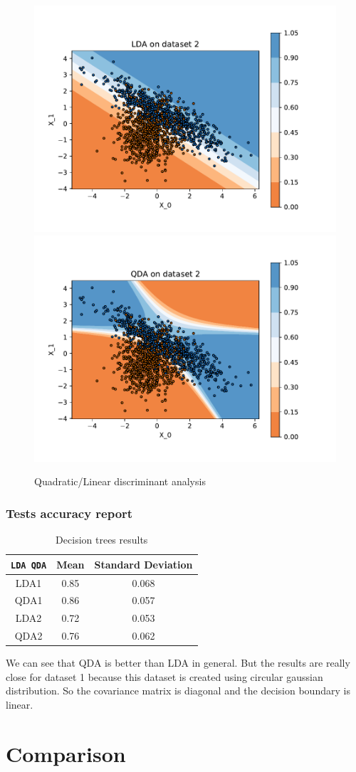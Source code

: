 \documentclass[12pt]{article}
\begin{document}
\begin{figure}[htp]
	\centering
	\includegraphics[width=.4\textwidth]{img/lda2.pdf}\quad
	\includegraphics[width=.4\textwidth]{img/qda2.pdf}\quad
	
	\caption{Quadratic/Linear discriminant analysis}
	\label{fig:qdalda}
\end{figure}
\subsubsection{Tests accuracy report}
	\begin{table}[!h]
		\centering
		\begin{tabular}{|c|c|c|}
		\hline
		\verb|LDA QDA|                      & Mean & Standard Deviation \\ \hline
		LDA1                                & 0.85 & 0.068              \\ \hline
		QDA1                                & 0.86 & 0.057              \\ \hline
		LDA2                                & 0.72 & 0.053              \\ \hline
		QDA2                                & 0.76 & 0.062              \\ \hline
		\end{tabular}
		\caption{Decision trees results}
		\label{tab:results-qdalda}
	\end{table}

We can see that QDA is better than LDA in general. But the results are really close for dataset 1 because this dataset is created using circular gaussian distribution. 
So the covariance matrix is diagonal and the decision boundary is linear.
\section{Comparison}
\end{document}
